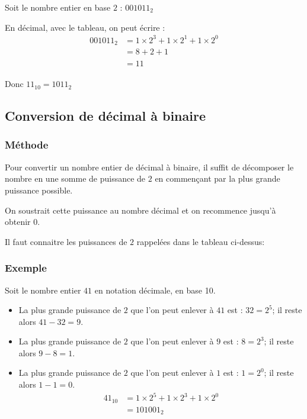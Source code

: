 \documentclass[11pt]{article}
\providecommand{\tightlist}{%
      \setlength{\itemsep}{0pt}\setlength{\parskip}{0pt}}
\begin{document}
Soit le nombre entier en base \(2\) : \(001011_{2}\)

En décimal, avec le tableau, on peut écrire : \begin{align*}
001011_{2} &= 1 \times 2^{3} + 1 \times 2^{1}+ 1 \times 2^{0}\\
\phantom{001011_{2}} &= 8+2+1\\
\phantom{001011_{2}} &= 11
\end{align*}

Donc \(11_{10}=1011_{2}\)

    \hypertarget{conversion-de-duxe9cimal-uxe0-binaire}{%
\subsection{Conversion de décimal à
binaire}\label{conversion-de-duxe9cimal-uxe0-binaire}}

\hypertarget{muxe9thode}{%
\subsubsection*{Méthode}\label{muxe9thode}}

Pour convertir un nombre entier de décimal à binaire, il suffit de
décomposer le nombre en une somme de puissance de \(2\) en commençant
par la plus grande puissance possible.

On soustrait cette puissance au nombre décimal et on recommence jusqu'à
obtenir \(0\).

Il faut connaitre les puissances de \(2\) rappelées dans le tableau
ci-dessus:

\hypertarget{exemple}{%
\subsubsection*{Exemple}\label{exemple}}

Soit le nombre entier \(41\) en notation décimale, en base 10.

\begin{itemize}
\tightlist
\item
  La plus grande puissance de \(2\) que l'on peut enlever à \(41\) est :
  \(32=2^{5}\); il reste alors \(41-32=9\).
\item
  La plus grande puissance de \(2\) que l'on peut enlever à \(9\) est :
  \(8=2^{3}\); il reste alors \(9-8=1\).
\item
  La plus grande puissance de \(2\) que l'on peut enlever à \(1\) est :
  \(1=2^{0}\); il reste alors \(1-1=0\). \begin{align*}
  41_{10} &= 1 \times 2^{5} + 1 \times 2^{3} + 1\times 2^{0}\\
  \phantom{41_{10}} &= 101001_{2}
  \end{align*}
\end{itemize}
\end{document}
